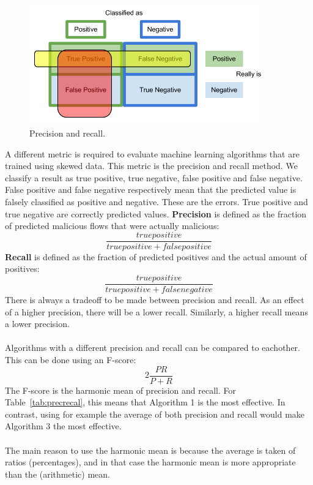 \begin{figure}[H]
\centering
\includegraphics[width=0.9\textwidth]{Figures/precisionrecall}
\decoRule
\caption[Precision and recall]{Precision and recall. \cite{recall-fig}}
\label{fig:precisionrecall}
\end{figure}
\noindent A different metric is required to evaluate machine learning algorithms that are trained using skewed data. This metric is the precision and recall method. We classify a result as true positive, true negative, false positive and false negative. False positive and false negative respectively mean that the predicted value is falsely classified as positive and negative. These are the errors. True positive and true negative are correctly predicted values. \textbf{Precision} is defined as the fraction of predicted malicious flows that were actually malicious: 
$$\dfrac{true positive}{true positive + false positive}$$
\textbf{Recall} is defined as the fraction of predicted positives and the actual amount of positives: 
$$\dfrac{true positive}{true positive + false negative}$$
There is always a tradeoff to be made between precision and recall. As an effect of a higher precision, there will be a lower recall. Similarly, a higher recall means a lower precision.\\\\
Algorithms with a different precision and recall can be compared to eachother. This can be done using an F-score: 
$$2 \dfrac{PR}{P+R}$$
\noindent The F-score is the harmonic mean of precision and recall. For Table~\ref{tab:precrecal}, this means that Algorithm 1 is the most effective. In contrast, using for example the average of both precision and recall would make Algorithm 3 the most effective.\\\\
The main reason to use the harmonic mean is because the average is taken of
ratios (percentages), and in that case the harmonic mean is more appropriate than the (arithmetic) mean. \cite{harmonic}
